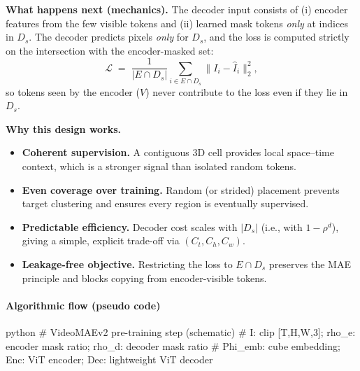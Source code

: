 \begin{enrichment}
\begin{enrichment}
            \medskip
            \noindent\textbf{What happens next (mechanics).}
            The decoder input consists of (i) encoder features from the few visible tokens and (ii) learned mask tokens \emph{only} at indices in $D_s$. The decoder predicts pixels \emph{only} for $D_s$, and the loss is computed strictly on the intersection with the encoder-masked set:
            \[
            \mathcal{L} \;=\; \frac{1}{|E\cap D_s|}\sum_{i\in E\cap D_s}\|I_i-\hat I_i\|_2^2,
            \]
            so tokens seen by the encoder ($V$) never contribute to the loss even if they lie in $D_s$.
            
            \medskip
            \noindent\textbf{Why this design works.}
            \begin{itemize}
                \item \textbf{Coherent supervision.} A contiguous 3D cell provides local space--time context, which is a stronger signal than isolated random tokens.
                \item \textbf{Even coverage over training.} Random (or strided) placement prevents target clustering and ensures every region is eventually supervised.
                \item \textbf{Predictable efficiency.} Decoder cost scales with $|D_s|$ (i.e., with $1-\rho^d$), giving a simple, explicit trade-off via $(C_t,C_h,C_w)$.
                \item \textbf{Leakage-free objective.} Restricting the loss to $E\cap D_s$ preserves the MAE principle and blocks copying from encoder-visible tokens.
            \end{itemize}
            
            \newpage 
            
            \paragraph{Algorithmic flow (pseudo code)}
            \begin{mintedbox}{python}
                # VideoMAEv2 pre-training step (schematic)
                # I: clip [T,H,W,3]; rho_e: encoder mask ratio; rho_d: decoder mask ratio
                # Phi_emb: cube embedding; Enc: ViT encoder; Dec: lightweight ViT decoder
                

\end{mintedbox}
\end{enrichment}
\end{enrichment}
